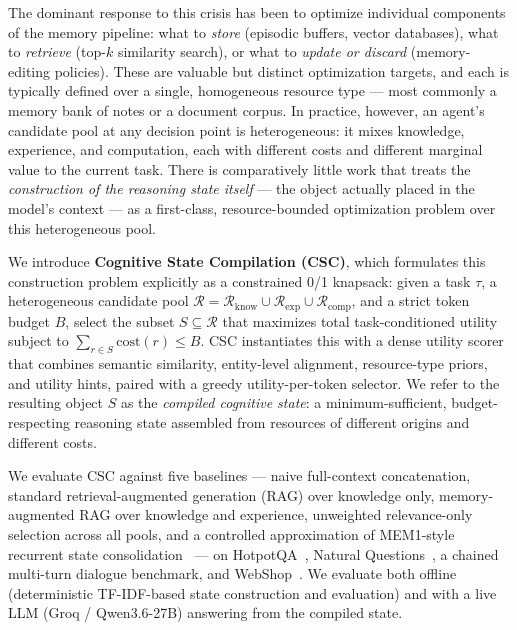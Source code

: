 \documentclass{article}
\begin{document}
The dominant response to this crisis has been to optimize individual components of the memory pipeline: what to \emph{store} (episodic buffers, vector databases), what to \emph{retrieve} (top-$k$ similarity search), or what to \emph{update or discard} (memory-editing policies). These are valuable but distinct optimization targets, and each is typically defined over a single, homogeneous resource type --- most commonly a memory bank of notes or a document corpus. In practice, however, an agent's candidate pool at any decision point is heterogeneous: it mixes knowledge, experience, and computation, each with different costs and different marginal value to the current task. There is comparatively little work that treats the \emph{construction of the reasoning state itself} --- the object actually placed in the model's context --- as a first-class, resource-bounded optimization problem over this heterogeneous pool.

We introduce \textbf{Cognitive State Compilation (CSC)}, which formulates this construction problem explicitly as a constrained 0/1 knapsack: given a task $\tau$, a heterogeneous candidate pool $\mathcal{R} = \mathcal{R}_{\text{know}} \cup \mathcal{R}_{\text{exp}} \cup \mathcal{R}_{\text{comp}}$, and a strict token budget $B$, select the subset $S \subseteq \mathcal{R}$ that maximizes total task-conditioned utility subject to $\sum_{r \in S} \text{cost}(r) \le B$. CSC instantiates this with a dense utility scorer that combines semantic similarity, entity-level alignment, resource-type priors, and utility hints, paired with a greedy utility-per-token selector. We refer to the resulting object $S$ as the \emph{compiled cognitive state}: a minimum-sufficient, budget-respecting reasoning state assembled from resources of different origins and different costs.

We evaluate CSC against five baselines --- naive full-context concatenation, standard retrieval-augmented generation (RAG) over knowledge only, memory-augmented RAG over knowledge and experience, unweighted relevance-only selection across all pools, and a controlled approximation of MEM1-style recurrent state consolidation~\citep{zhou2025mem1} --- on HotpotQA~\citep{yang2018hotpotqa}, Natural Questions~\citep{kwiatkowski2019natural}, a chained multi-turn dialogue benchmark, and WebShop~\citep{yao2022webshop}. We evaluate both offline (deterministic TF-IDF-based state construction and evaluation) and with a live LLM (Groq / Qwen3.6-27B) answering from the compiled state.
\end{document}
